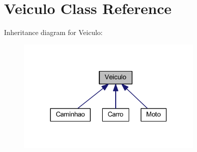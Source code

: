\hypertarget{class_veiculo}{}\section{Veiculo Class Reference}
\label{class_veiculo}


Inheritance diagram for Veiculo\+:
\nopagebreak
\begin{figure}[H]
\begin{center}
\leavevmode
\includegraphics[width=254pt]{class_veiculo__inherit__graph}
\end{center}
\end{figure}
